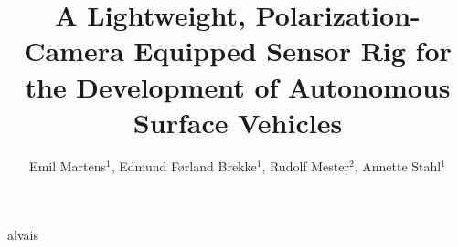 \documentclass{iopconfser}
\begin{document}
\title{A Lightweight, Polarization-Camera Equipped Sensor Rig for the Development of Autonomous Surface Vehicles}

\author{Emil Martens$^{1}$, Edmund Førland Brekke$^{1}$, Rudolf Mester$^{2}$, Annette Stahl$^{1}$}

alvais






\pagebreak 









\printbibliography
\end{document}

